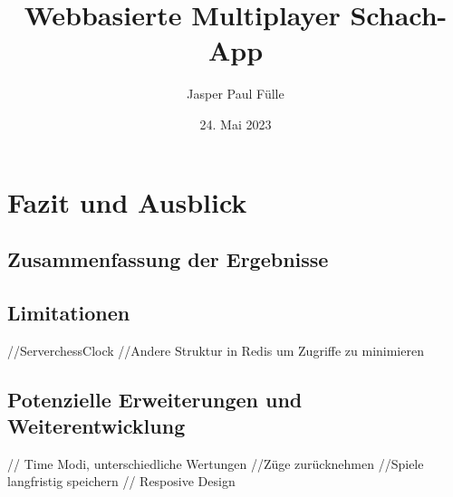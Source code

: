 \documentclass[a4paper, 11pt, bibliography=totoc, abstract=true]{scrreprt}
\title{Webbasierte Multiplayer Schach-App}
\author{Jasper Paul Fülle}
\date{24. Mai 2023}
\begin{document}



\setcounter{page}{1}
\tableofcontents
\newpage
\newpage\thispagestyle{empty}\hspace{1em}\newpage
{}
\setcounter{page}{1}

\newpage
\newpage\thispagestyle{empty}\hspace{1em}\newpage
	
	\newpage
\newpage\thispagestyle{empty}\hspace{1em}\newpage

\newpage
\newpage\thispagestyle{empty}\hspace{1em}\newpage

    \newpage
\newpage\thispagestyle{empty}\hspace{1em}\newpage

\chapter{Fazit und Ausblick}
    \section{Zusammenfassung der Ergebnisse}
    \section{Limitationen}
    //ServerchessClock
    //Andere Struktur in Redis um Zugriffe zu minimieren
    \section{Potenzielle Erweiterungen und Weiterentwicklung}
	// Time Modi, unterschiedliche Wertungen
	//Züge zurücknehmen
	//Spiele langfristig speichern
	// Resposive Design

\appendix

\listoffigures


\end{document}

